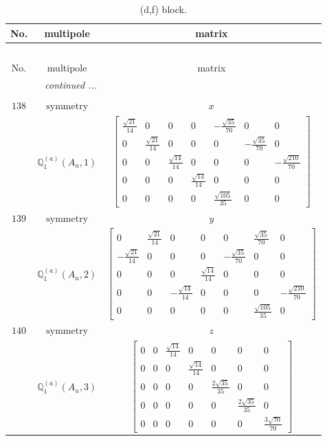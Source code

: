 \documentclass[fleqn,8pt,landscape]{jsarticle}
\begin{document}
\begin{longtable}{ccc}
\caption{(d,f) block.}
 \\
 \hline \hline
No. & multipole & matrix \\ \hline \endfirsthead

\multicolumn{2}{l}{\tablename\ \thetable{}} \\
 \hline \hline
No. & multipole & matrix \\ \hline \endhead

 \hline \hline
\multicolumn{2}{r}{\footnotesize\it continued ...} \\ \endfoot

 \hline \hline
\multicolumn{2}{r}{} \\ \endlastfoot

$ 138 $ & $ \text{symmetry} $ & $ x $ \\
$  $ & $ \mathbb{Q}_{1}^{(a)}(A_{u},1) $ & $ \begin{bmatrix} \frac{\sqrt{21}}{14} & 0 & 0 & 0 & - \frac{\sqrt{35}}{70} & 0 & 0 \\ 0 & \frac{\sqrt{21}}{14} & 0 & 0 & 0 & - \frac{\sqrt{35}}{70} & 0 \\ 0 & 0 & \frac{\sqrt{14}}{14} & 0 & 0 & 0 & - \frac{\sqrt{210}}{70} \\ 0 & 0 & 0 & \frac{\sqrt{14}}{14} & 0 & 0 & 0 \\ 0 & 0 & 0 & 0 & \frac{\sqrt{105}}{35} & 0 & 0 \end{bmatrix} $ \\ \hline
$ 139 $ & $ \text{symmetry} $ & $ y $ \\
$  $ & $ \mathbb{Q}_{1}^{(a)}(A_{u},2) $ & $ \begin{bmatrix} 0 & \frac{\sqrt{21}}{14} & 0 & 0 & 0 & \frac{\sqrt{35}}{70} & 0 \\ - \frac{\sqrt{21}}{14} & 0 & 0 & 0 & - \frac{\sqrt{35}}{70} & 0 & 0 \\ 0 & 0 & 0 & \frac{\sqrt{14}}{14} & 0 & 0 & 0 \\ 0 & 0 & - \frac{\sqrt{14}}{14} & 0 & 0 & 0 & - \frac{\sqrt{210}}{70} \\ 0 & 0 & 0 & 0 & 0 & \frac{\sqrt{105}}{35} & 0 \end{bmatrix} $ \\ \hline
$ 140 $ & $ \text{symmetry} $ & $ z $ \\
$  $ & $ \mathbb{Q}_{1}^{(a)}(A_{u},3) $ & $ \begin{bmatrix} 0 & 0 & \frac{\sqrt{14}}{14} & 0 & 0 & 0 & 0 \\ 0 & 0 & 0 & \frac{\sqrt{14}}{14} & 0 & 0 & 0 \\ 0 & 0 & 0 & 0 & \frac{2 \sqrt{35}}{35} & 0 & 0 \\ 0 & 0 & 0 & 0 & 0 & \frac{2 \sqrt{35}}{35} & 0 \\ 0 & 0 & 0 & 0 & 0 & 0 & \frac{3 \sqrt{70}}{70} \end{bmatrix} $ \\ \hline

\end{longtable}
\end{document}
